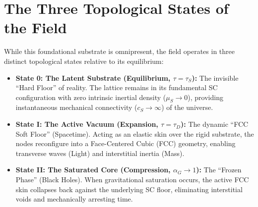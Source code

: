 \section{The Three Topological States of the Field}
While this foundational substrate is omnipresent, the field operates in three distinct topological states relative to its equilibrium:
\begin{itemize}
    \item \textbf{State 0: The Latent Substrate (Equilibrium, $\tau = \tau_S$):} The invisible ``Hard Floor'' of reality. The lattice remains in its fundamental SC configuration with zero intrinsic inertial density ($\mu_S \to 0$), providing instantaneous mechanical connectivity ($c_S \to \infty$) of the universe.
    \item \textbf{State I: The Active Vacuum (Expansion, $\tau = \tau_D$):} The dynamic ``FCC Soft Floor'' (Spacetime). Acting as an elastic skin over the rigid substrate, the nodes reconfigure into a Face-Centered Cubic (FCC) geometry, enabling transverse waves (Light) and interstitial inertia (Mass).
    \item \textbf{State II: The Saturated Core (Compression, $\alpha_G \to 1$):} The ``Frozen Phase'' (Black Holes). When gravitational saturation occurs, the active FCC skin collapses back against the underlying SC floor, eliminating interstitial voids and mechanically arresting time.
\end{itemize}

